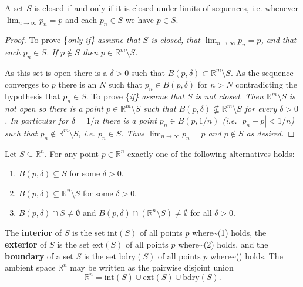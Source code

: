 \documentclass[10pt,a4paper,UTF8]{article}
\begin{document}
\begin{tikztheorem}
A set \(S\) is closed if and only if it is closed under limits of sequences, i.e. whenever \(\lim_{n\to\infty} p_n=p\)  and each \(p_n\in S\) we have \(p\in S\).
\end{tikztheorem}
\begin{proof}
To prove \{\em only if\} assume that \(S\) is closed, that \(\lim_{n\to\infty} p_n=p\),  and that each \(p_n\in S\). If \(p\notin S\) then \(p\in\mathbb{R}^m\setminus S\).

As this set is open  there is a \(\delta > 0\) such that \(B(p,\delta)\subset \mathbb{R}^m\setminus S\).
As the sequence converges to \(p\) there is an \(N\) such that \(p_n\in B(p,\delta)\) for \(n > N\) contradicting the
hypothesis that \(p_n\in S\). To prove \{\em if\} assume that \(S\) is not closed.
Then \(\mathbb{R}^m\setminus S\) is not open so there is a point \(p\in\mathbb{R}^m\setminus S\) such that
\(B(p,\delta)\not\subseteq \mathbb{R}^m\setminus S\) for every \(\delta > 0\). In particular for \(\delta=1/n\) there is a point
\(p_n\in B(p,1/n)\) (i.e. \(|p_n-p|<1/n\)) such that \(p_n\notin \mathbb{R}^m\setminus S\), i.e. \(p_n\in S\). Thus
\(\lim_{n\to\infty}p_n=p\) and \(p\notin S\) as desired.
\end{proof}

Let  \(S\subseteq\mathbb{R}^n\). For any point \(p\in\mathbb{R}^n\) exactly one of the following alternatives holds:

\begin{enumerate}
\item \(B(p,\delta)\subseteq S\) for some \(\delta > 0\).
\item \(B(p,\delta)\subseteq \mathbb{R}^n\setminus S\) for some \(\delta > 0\).
\item \(B(p,\delta)\cap S\ne\emptyset\) and \(B(p,\delta)\cap (\mathbb{R}^n\setminus S)\ne\emptyset\) for all \(\delta > 0\).
\end{enumerate}

The \textbf{interior} of  \(S\) is the set \(\mathrm{int}(S)\) of all points \(p\)  where\textasciitilde{}(1) holds,
the \textbf{exterior}  of \(S\) is the set  \(\mathrm{ext}(S)\) of all points \(p\)  where\textasciitilde{}(2) holds, and
the \textbf{boundary} of a set \(S\) is the set \(\mathrm{bdry}(S)\) of all points \(p\)  where\textasciitilde{}() holds.
The ambient space \(\mathbb{R}^n\) may be written as the pairwise disjoint union \[ \mathbb{R}^n=\mathrm{int}(S)\cup\mathrm{ext}(S)\cup\mathrm{bdry}(S).\]
\end{document}
